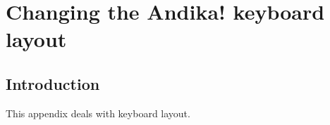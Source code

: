 \chapter{Changing the \textbf{Andika!} keyboard layout}
\renewcommand{\thesection}{C/\arabic{section}}  %
\setcounter{section}{0}  %

\section{Introduction}
\label{appc:intro}

This appendix deals with keyboard layout.





